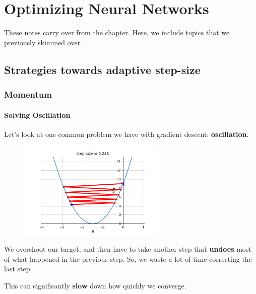 \setcounter{chapter}{10-1} %

\chapter{Optimizing Neural Networks}

    These notes carry over from the  chapter. Here, we include topics that we previously skimmed over.

    \section{Strategies towards adaptive step-size}

        \subsection{Momentum}
    
        \subsubsection{Solving Oscillation}
    
            Let's look at one common problem we have with gradient descent: \textbf{oscillation}. 
            
            \begin{figure}[H]
                \centering
                    \includegraphics[width=70mm,scale=0.5]{images/gradient_descent_images/oscillate.png}
            \end{figure}
            
            We overshoot our target, and then have to take another step that \textbf{undoes} most of what happened in the previous step. So, we waste a lot of time correcting the last step.
                
            This can significantly \textbf{slow} down how quickly we converge.
                
